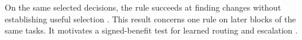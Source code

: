 On the same selected decisions, the rule succeeds at finding changes without establishing useful selection \citep[cf.][]{zhang2026credit}. This result concerns one rule on later blocks of the same tasks. It motivates a signed-benefit test for learned routing and escalation \citep{li2026dynamicmp,piatrashyn2026redact,lei2026tacit}.


